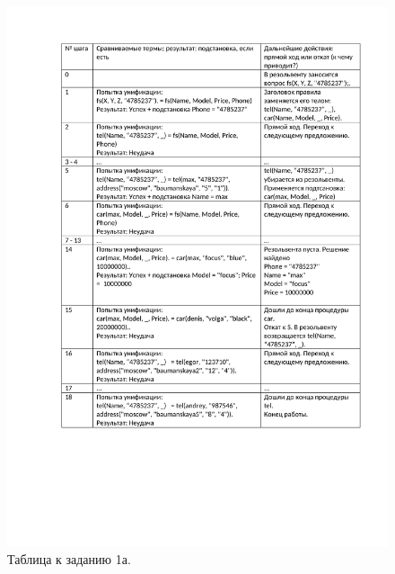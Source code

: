 \newpage
\begin{figure}[H]
	\caption{Таблица к заданию 1а.}
	\begin{center}
		\includegraphics[scale=0.85]{img/12.1a.pdf}
	\end{center}

\end{figure}

